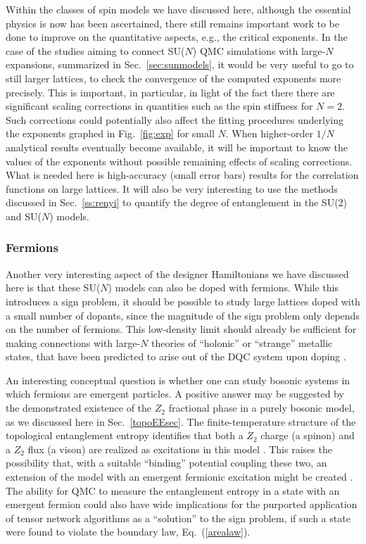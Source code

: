 \documentclass[range]{ar2e}
\begin{document}
Within the classes of spin models we have discussed here, although the essential physics is now has been ascertained, there still remains
important work to be done to improve on the quantitative aspects, e.g., the critical exponents. In the case of the studies aiming to connect
SU($N$) QMC simulations with large-$N$ expansions, summarized in Sec.~\ref{sec:sunmodels}, it would be very useful to go to still larger lattices, 
to check the convergence of the computed exponents more precisely. This is important, in particular, in light of the fact there there are significant scaling 
corrections in quantities such as the spin stiffness for $N=2$. Such corrections could potentially also affect the fitting procedures underlying 
the exponents graphed in Fig.~\ref{fig:exp} for small $N$. When higher-order $1/N$ analytical results eventually become available, it will be important to know 
the values of the exponents without possible remaining effects of scaling corrections. What is needed here is high-accuracy (small error bars) 
results for the correlation functions on large lattices. It will also be very interesting to use the methods discussed in Sec.~\ref{ss:renyi} to quantify 
the degree of entanglement in the SU($2$) and SU($N$) models.

\subsubsection{Fermions}

Another very interesting aspect of the designer Hamiltonians we have discussed here is that these SU($N$) models can also be doped with fermions. While this 
introduces a sign problem, it should be possible to study large lattices doped with a small number of dopants, since the magnitude of the 
sign problem only depends on the number of fermions. This low-density limit should already be sufficient for making connections with 
large-$N$ theories of ``holonic'' or ``strange'' metallic states, that have been predicted to arise out of the DQC system upon 
doping \cite{kaul2008:u1}.

An interesting conceptual question is whether one can study bosonic systems in which fermions are emergent particles.
A positive answer may be suggested by the demonstrated existence of the $Z_2$ fractional phase in a purely bosonic model, as we
discussed here in Sec.~\ref{topoEEsec}. 
The finite-temperature structure of the topological entanglement entropy identifies that both a $Z_2$ charge (a spinon) and a $Z_2$ flux (a vison) are realized as excitations in this model \cite{TopoEE}.
This raises the possibility that, with a suitable ``binding'' potential \cite{FermionBind} coupling these two, an extension of 
the model with an emergent fermionic excitation might be created \cite{Wenbook}.  
The ability for QMC to measure the entanglement entropy in a state with an emergent fermion
could also have wide implications for the purported application of tensor network algorithms as a ``solution'' to the sign problem, 
if such a state were found to violate the boundary law, Eq.~(\ref{arealaw}). 
\end{document}
